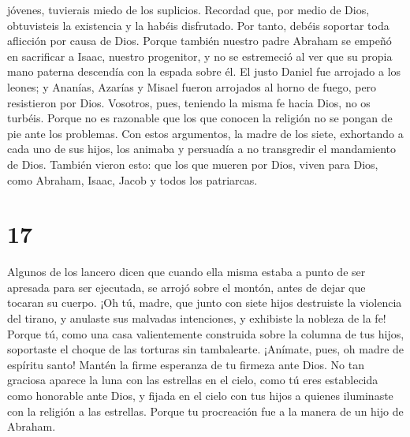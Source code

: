 jóvenes, tuvierais miedo de los suplicios.  Recordad que,
por medio de Dios, obtuvisteis la existencia y la habéis disfrutado.
 Por tanto, debéis soportar toda aflicción por causa de
Dios.  Porque también nuestro padre Abraham se empeñó en
sacrificar a Isaac, nuestro progenitor, y no se estremeció al ver que su
propia mano paterna descendía con la espada sobre él.  El
justo Daniel fue arrojado a los leones; y Ananías, Azarías y Misael
fueron arrojados al horno de fuego, pero resistieron por Dios.
 Vosotros, pues, teniendo la misma fe hacia Dios, no os
turbéis.  Porque no es razonable que los que conocen la
religión no se pongan de pie ante los problemas.  Con
estos argumentos, la madre de los siete, exhortando a cada uno de sus
hijos, los animaba y persuadía a no transgredir el mandamiento de Dios.
 También vieron esto: que los que mueren por Dios, viven
para Dios, como Abraham, Isaac, Jacob y todos los patriarcas.

\hypertarget{section-16}{%
\section{17}\label{section-16}}

 Algunos de los lancero dicen que cuando ella misma estaba
a punto de ser apresada para ser ejecutada, se arrojó sobre el montón,
antes de dejar que tocaran su cuerpo.  ¡Oh tú, madre, que
junto con siete hijos destruiste la violencia del tirano, y anulaste sus
malvadas intenciones, y exhibiste la nobleza de la fe! 
Porque tú, como una casa valientemente construida sobre la columna de
tus hijos, soportaste el choque de las torturas sin tambalearte.
 ¡Anímate, pues, oh madre de espíritu santo! Mantén la
firme esperanza de tu firmeza ante Dios.  No tan graciosa
aparece la luna con las estrellas en el cielo, como tú eres establecida
como honorable ante Dios, y fijada en el cielo con tus hijos a quienes
iluminaste con la religión a las estrellas.  Porque tu
procreación fue a la manera de un hijo de Abraham.

